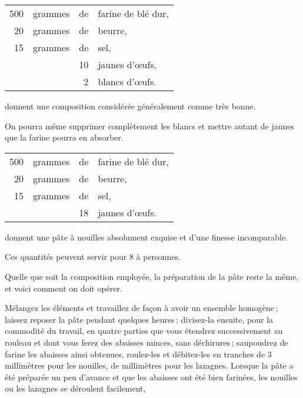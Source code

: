 \footnotesize
\begin{longtable}{rrrp{16em}}
    500 & grammes & de & farine de blé dur,                                                               \\
     20 & grammes & de & beurre,                                                                          \\
     15 & grammes & de & sel,                                                                             \\
        &         & 10 & jaunes d'œufs,                                                                   \\
        &         &  2 & blancs d'œufs.                                                                   \\
\end{longtable}
\normalsize

donnent une composition considérée généralement comme très bonne.

\medskip

On pourra même supprimer complètement les blancs et mettre autant de
jaunes que la farine pourra en absorber.

\footnotesize
\begin{longtable}{rrrp{16em}}
    500 & grammes & de & farine de blé dur,                                                               \\
     20 & grammes & de & beurre,                                                                          \\
     15 & grammes & de & sel,                                                                             \\
        &         & 18 & jaunes d'œufs.                                                                   \\
\end{longtable}
\normalsize

donnent une pâte à nouilles absolument exquise et d'une finesse incomparable.

Ces quantités peuvent servir pour 8 à {\mmm} personnes.

Quelle que soit la composition employée, la préparation de la pâte reste la
même, et voici comment on doit opérer.

Mélangez les éléments et travaillez de façon à avoir un ensemble homogène ;
laissez reposer la pâte pendant quelques heures ; divisez-la ensuite, pour la
commodité du travail, en quatre parties que vous étendrez successivement au
rouleau et dont vous ferez des abaisses minces, sans déchirures ; saupoudrez de
farine les abaisses ainsi obtenues, roulez-les et débitez-les en tranches de
3 millimètres pour les nouilles, de {\mmm} millimètres pour les lazagnes.
Lorsque la pâte a été préparée un peu d'avance et que les abaisses ont été bien
farinées, les nouilles ou les lazagnes se déroulent facilement,

